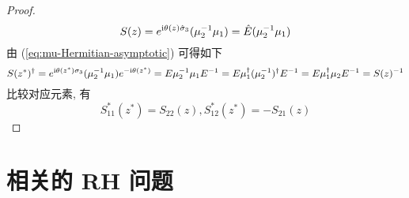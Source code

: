 \begin{proof}
  \begin{equation}
    S(z) = e^{\mathrm{i} \theta(z) \hat{\sigma}_{3}} (\mu_{2}^{-1}\mu_{1}) = \hat{E}(\mu_{2}^{-1}\mu_{1}) 
  \end{equation}
  由 (\ref{eq:mu-Hermitian-asymptotic}) 可得如下
  \begin{equation}
    S(z^{*})^{\dagger} = e^{\mathrm{i} \theta(z^{*}) \sigma_{3}} (\mu_{2}^{-1}\mu_{1})  e^{-\mathrm{i} \theta(z^{*})} = E \mu_{2}^{-1}\mu_{1} E^{-1} = E \mu_{1}^{\dagger} (\mu_{2}^{-1})^{\dagger} E^{-1} = E \mu_{1}^{\dagger} \mu_{2} E^{-1} = S(z)^{-1} 
  \end{equation}
  比较对应元素, 有
  \begin{equation}
    S_{11}^{*}(z^{*}) = S_{22}(z), S_{12}^{*}(z^{*}) = - S_{21}(z) \label{eq:S-symmetry}
  \end{equation} 
\end{proof}

\section{相关的 RH 问题}
